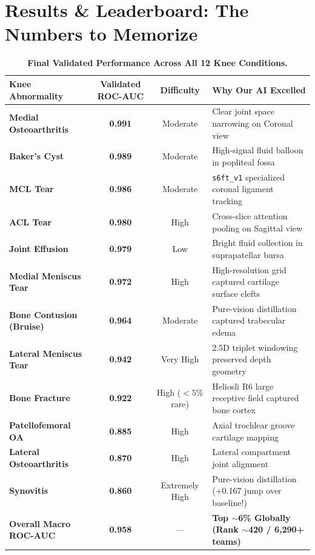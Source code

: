 \documentclass[11pt,a4paper]{article}
\begin{document}
\newpage

\section{Results \& Leaderboard: The Numbers to Memorize}

\begin{table}[h!]
\centering
\small
\renewcommand{\arraystretch}{1.25}
\begin{tabularx}{\textwidth}{l c c X}
\toprule
\textbf{Knee Abnormality} & \textbf{Validated ROC-AUC} & \textbf{Difficulty} & \textbf{Why Our AI Excelled} \\
\midrule
\textbf{Medial Osteoarthritis} & \textbf{0.991} & Moderate & Clear joint space narrowing on Coronal view \\
\textbf{Baker's Cyst} & \textbf{0.989} & Moderate & High-signal fluid balloon in popliteal fossa \\
\textbf{MCL Tear} & \textbf{0.986} & Moderate & \texttt{s6ft\_v1} specialized coronal ligament tracking \\
\textbf{ACL Tear} & \textbf{0.980} & High & Cross-slice attention pooling on Sagittal view \\
\textbf{Joint Effusion} & \textbf{0.979} & Low & Bright fluid collection in suprapatellar bursa \\
\textbf{Medial Meniscus Tear} & \textbf{0.972} & High & High-resolution grid captured cartilage surface clefts \\
\textbf{Bone Contusion (Bruise)} & \textbf{0.964} & Moderate & Pure-vision distillation captured trabecular edema \\
\textbf{Lateral Meniscus Tear} & \textbf{0.942} & Very High & 2.5D triplet windowing preserved depth geometry \\
\textbf{Bone Fracture} & \textbf{0.922} & High ($<5\%$ rare) & Heliosli R6 large receptive field captured bone cortex \\
\textbf{Patellofemoral OA} & \textbf{0.885} & High & Axial trochlear groove cartilage mapping \\
\textbf{Lateral Osteoarthritis} & \textbf{0.870} & High & Lateral compartment joint alignment \\
\textbf{Synovitis} & \textbf{0.860} & Extremely High & Pure-vision distillation (+0.167 jump over baseline!) \\
\midrule
\textbf{Overall Macro ROC-AUC} & \textbf{0.958} & --- & \textbf{Top $\sim$6\% Globally (Rank $\sim$420 / 6,290+ teams)} \\
\bottomrule
\end{tabularx}
\caption{\textbf{Final Validated Performance Across All 12 Knee Conditions.}}
\end{table}
\end{document}
